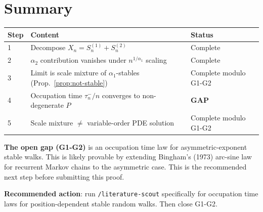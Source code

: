 \documentclass{amsart}
\theoremstyle{definition}
\begin{document}
\section{Summary}

\begin{center}
\begin{tabular}{lll}
\hline
Step & Content & Status \\
\hline
1 & Decompose $X_n = S_n^{(1)} + S_n^{(2)}$ & Complete \\
2 & $\alpha_2$ contribution vanishes under $n^{1/\alpha_1}$ scaling & Complete \\
3 & Limit is scale mixture of $\alpha_1$-stables (Prop.~\ref{prop:not-stable}) & Complete modulo G1-G2 \\
4 & Occupation time $\tau_n^-/n$ converges to non-degenerate $P$ & \textbf{GAP} \\
5 & Scale mixture $\neq$ variable-order PDE solution & Complete modulo G1-G2 \\
\hline
\end{tabular}
\end{center}

\medskip
\textbf{The open gap (G1-G2)} is an occupation time law for asymmetric-exponent
stable walks. This is likely provable by extending Bingham's (1973) arc-sine law
for recurrent Markov chains to the asymmetric case. This is the recommended next
step before submitting this proof.

\medskip
\textbf{Recommended action}: run \texttt{/literature-scout} specifically for
occupation time laws for position-dependent stable random walks. Then close G1-G2.
\end{document}
